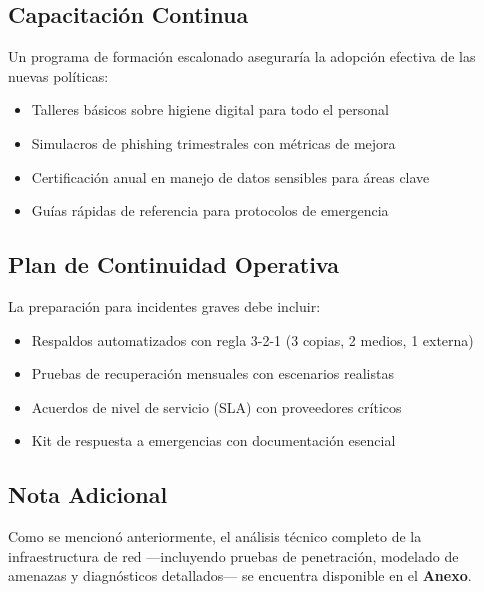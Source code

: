 \subsection*{Capacitación Continua}
Un programa de formación escalonado aseguraría la adopción efectiva de las nuevas políticas:

\begin{itemize}
	\item Talleres básicos sobre higiene digital para todo el personal
	\item Simulacros de phishing trimestrales con métricas de mejora
	\item Certificación anual en manejo de datos sensibles para áreas clave
	\item Guías rápidas de referencia para protocolos de emergencia
\end{itemize}

\subsection*{Plan de Continuidad Operativa}
La preparación para incidentes graves debe incluir:

\begin{itemize}
	\item Respaldos automatizados con regla 3-2-1 (3 copias, 2 medios, 1 externa)
	\item Pruebas de recuperación mensuales con escenarios realistas
	\item Acuerdos de nivel de servicio (SLA) con proveedores críticos
	\item Kit de respuesta a emergencias con documentación esencial
\end{itemize}

\subsection*{Nota Adicional} 
Como se mencionó anteriormente, el análisis técnico completo de la infraestructura de red —incluyendo pruebas de penetración, modelado de amenazas y diagnósticos detallados— se encuentra disponible en el \textbf{Anexo}.
